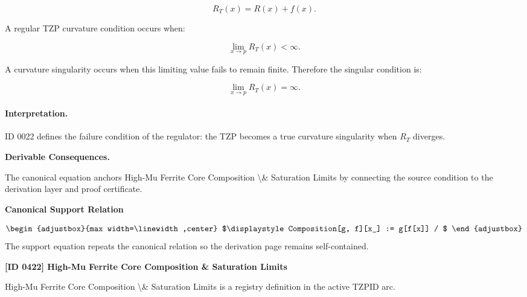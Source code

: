 \begin{equation}
R_T(x)=R(x)+f(x).
\end{equation}

A regular TZP curvature condition occurs when:

\begin{equation}
\lim_{x\to p}R_T(x)<\infty .
\end{equation}

A curvature singularity occurs when this limiting value fails to remain finite. Therefore the singular condition is:

\begin{equation}
\boxed{
\lim_{x\to p}R_T(x)=\infty .
}
\end{equation}

\paragraph{Interpretation.}
ID 0022 defines the failure condition of the regulator: the TZP becomes a true curvature singularity when $R_T$ diverges.

\par\vspace{0.35em}
\noindent\textbf{Derivable Consequences.}\quad
\begingroup
\footnotesize
\raggedright
The canonical equation anchors High-Mu Ferrite Core Composition \textbackslash{}\& Saturation Limits by connecting the source condition to the derivation layer and proof certificate.
\par\endgroup

\noindent\textbf{Canonical Support Relation}\par
\[
\begin{adjustbox}{max width=\linewidth,center}
$\displaystyle
Composition[g, f][x_] := g[f[x]] /
$
\end{adjustbox}
\]
\noindent The support equation repeats the canonical relation so the derivation page remains self-contained.\par

\clearpage
\noindent\textbf{[ID 0422] High-Mu Ferrite Core Composition \& Saturation Limits}\par
\vspace{0.35em}
\begingroup\small
{}
High-Mu Ferrite Core Composition \textbackslash{}\& Saturation Limits is a registry definition in the active TZPID arc.

